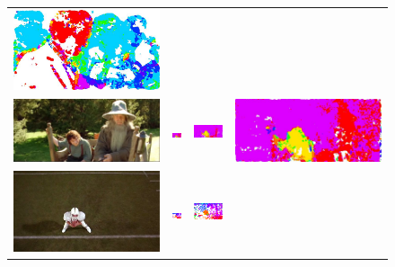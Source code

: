 \begin{figure}[t!]
\begin{center}
\begin{tabular}{cccc}
\includegraphics[width=.23\textwidth]{cvpr14_figures/flow/flow_actioncliptest00686_frame010_traj_quant.jpeg} \\
\includegraphics[width=.23\textwidth]{cvpr14_figures/flow/flow_actioncliptest00538_frame014.jpeg} & 
\includegraphics[width=.23\textwidth]{cvpr14_figures/flow/flow_actioncliptest00538_frame014_mv_quant.png} & 
\includegraphics[width=.23\textwidth]{cvpr14_figures/flow/flow_actioncliptest00538_frame014_stip_quant.png} & 
\includegraphics[width=.23\textwidth]{cvpr14_figures/flow/flow_actioncliptest00538_frame014_traj_quant.jpeg} \\
\includegraphics[width=.23\textwidth]{cvpr14_figures/flow/flow_actioncliptest00870_frame013.jpeg} & 
\includegraphics[width=.23\textwidth]{cvpr14_figures/flow/flow_actioncliptest00870_frame014_mv_quant.png} & 
\includegraphics[width=.23\textwidth]{cvpr14_figures/flow/flow_actioncliptest00870_frame013_stip_quant.png} & 

\end{tabular}
\end{center}
\end{figure}
